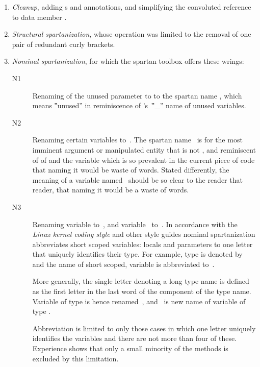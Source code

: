 \begin{enumerate}
  \item \emph{Cleanup}, adding s and  annotations,
      and simplifying the convoluted reference to data member .
    \item \emph{Structural spartanization}, whose operation was limited to the
      removal of one pair of redundant curly brackets.
    \item \emph{Nominal spartanization}, for which the spartan toolbox offers these
      wrings:
      \begin{description}
        \item[N1] Renaming of the unused
      parameter  to  to the spartan name
      \cc{\_\_}, which means ‟unused” in reminiscence of \Prolog's~‟\cc\_”
      name of unused variables.
    \item[N2] Renaming certain variables to~. The
      spartan name~ is for the most imminent argument or manipulated
      entity that is not , and reminiscent of  of \ML and
        \HyperTalk
        the variable which is so prevalent in the current piece of code that
        naming it would be waste of words. Stated differently, the
        meaning of a variable named~ should be so clear to the reader that
        reader, that naming it would be a waste of words.

      \item[N3] Renaming variable  to~, and variable~
        to~. In accordance with the \emph{Linux kernel coding style}%
        and other style guides nominal spartanization abbreviates short scoped
        variables: locals and parameters to one letter that uniquely identifies
        their type. For example, type  is denoted by~ and the
        name of short scoped, variable  is abbreviated to~.

        More generally, the single letter denoting a long type name is defined
        as the first letter in the last word of the component of the type name.
        Variable  of type  is hence renamed~,
        and~ is new name of variable  of type .

        Abbreviation is limited to only those cases in which one letter
        uniquely identifies the variables and there are not more than four of
        these. Experience shows that only a small minority of the methods is
        excluded by this limitation.
\end{description}
  \end{enumerate}

